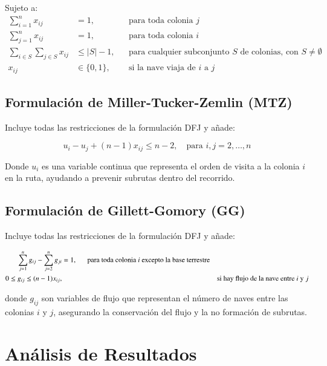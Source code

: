 \documentclass[
	spanish, %
	oneside
]{article}
\begin{document}
Sujeto a:
\begin{align}
    \sum_{i=1}^{n} x_{ij} &= 1, && \text{para toda colonia } j \\
    \sum_{j=1}^{n} x_{ij} &= 1, && \text{para toda colonia } i \\
    \sum_{i \in S}\sum_{j \in S} x_{ij} &\leq |S| - 1, && \text{para cualquier subconjunto } S \text{ de colonias, con } S \neq \emptyset \\
    x_{ij} &\in \{0, 1\}, && \text{si la nave viaja de } i \text{ a } j
\end{align}

\subsection*{Formulación de Miller-Tucker-Zemlin (MTZ)}

Incluye todas las restricciones de la formulación DFJ y añade:

\begin{equation}
    u_i - u_j + (n - 1)x_{ij} \leq n - 2, \quad \text{para } i, j = 2, \ldots, n
\end{equation}

\noindent Donde \( u_i \) es una variable continua que representa el orden de visita a la colonia \( i \) en la ruta, ayudando a prevenir subrutas dentro del recorrido.

\subsection*{Formulación de Gillett-Gomory (GG)}

Incluye todas las restricciones de la formulación DFJ y añade:

\begin{align}
    \sum_{j=1}^{n} g_{ij} - \sum_{j=2}^{n} g_{ji} &= 1, \text{\indent para toda colonia } i \text{ excepto la base terrestre} \\
    0 \leq g_{ij} \leq (n - 1)x_{ij}, && \text{si hay flujo de la nave entre } i \text{ y } j
\end{align}

donde \( g_{ij} \) son variables de flujo que representan el número de naves entre las colonias \( i \) y \( j \), asegurando la conservación del flujo y la no formación de subrutas.


\section{Análisis de Resultados}
\end{document}
